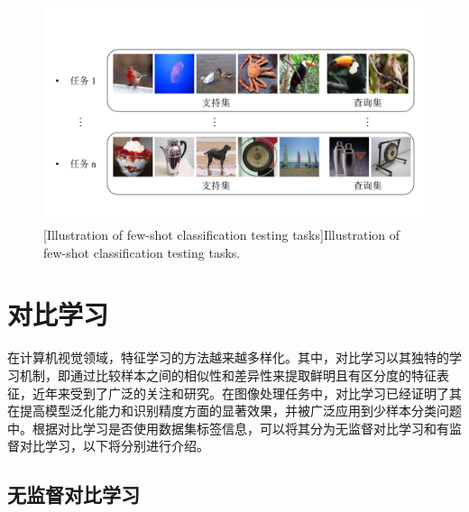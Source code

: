 \begin{figure}[h!]
  \centering
  \includegraphics[width=1.0\columnwidth]{figures/RelatedWork/少样本分类测试任务.pdf}
  [Illustration of few-shot classification testing tasks]{Illustration of few-shot classification testing tasks.}
  \label{figure2: 少样本分类测试任务}
\end{figure}

\section[\hspace{-2pt}对比学习]{{\heiti{} \hspace{-8pt}对比学习}}\label{section2: 对比学习}

在计算机视觉领域，特征学习的方法越来越多样化。其中，对比学习以其独特的学习机制，即通过比较样本之间的相似性和差异性来提取鲜明且有区分度的特征表征，近年来受到了广泛的关注和研究。在图像处理任务中，对比学习已经证明了其在提高模型泛化能力和识别精度方面的显著效果，并被广泛应用到少样本分类问题中。根据对比学习是否使用数据集标签信息，可以将其分为无监督对比学习和有监督对比学习，以下将分别进行介绍。

\subsection[\hspace{-2pt}无监督对比学习]{{\heiti{} \hspace{-8pt}无监督对比学习}}\label{section2: 无监督对比学习}

